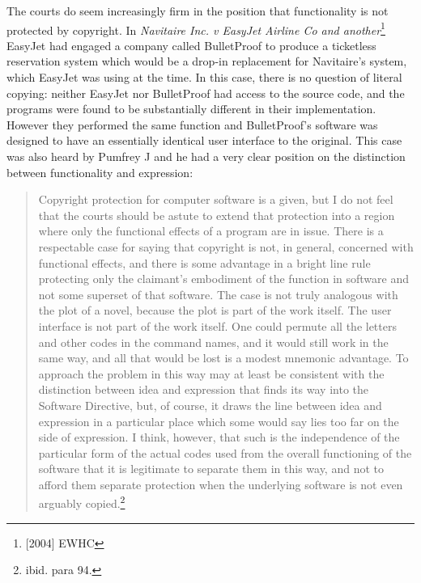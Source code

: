 \documentclass[a4paper,12pt]{article}
\begin{document}
The courts do seem increasingly firm in the position that functionality is
not protected by copyright. In \emph{Navitaire Inc. v EasyJet Airline Co and
  another}\footnote{[2004] EWHC} EasyJet had engaged a company called
BulletProof to produce a ticketless reservation system which would be a
drop-in replacement for Navitaire's system, which EasyJet was using at the
time. In this case, there is no question of literal copying: neither EasyJet
nor BulletProof had access to the source code, and the programs were found
to be substantially different in their implementation. However they
performed the same function and BulletProof's software was designed to have
an essentially identical user interface to the original. This case was also
heard by Pumfrey J and he had a very clear position on the distinction
between functionality and expression:
\begin{quotation}
Copyright protection for computer software is a given, but I do not feel that the courts
should be astute to extend that protection into a region where only the functional
effects of a program are in issue. There is a respectable case for saying that copyright
is not, in general, concerned with functional effects, and there is some advantage in a
bright line rule protecting only the claimant's embodiment of the function in software
and not some superset of that software. The case is not truly analogous with the plot
of a novel, because the plot is part of the work itself. The user interface is not part of
the work itself. One could permute all the letters and other codes in the command
names, and it would still work in the same way, and all that would be lost is a modest
mnemonic advantage. To approach the problem in this way may at least be consistent
with the distinction between idea and expression that finds its way into the Software
Directive, but, of course, it draws the line between idea and expression in a particular
place which some would say lies too far on the side of expression. I think, however,
that such is the independence of the particular form of the actual codes used from the
overall functioning of the software that it is legitimate to separate them in this way,
and not to afford them separate protection when the underlying software is not even
arguably copied.\footnote{ibid. para 94.}
\end{quotation}
\end{document}
